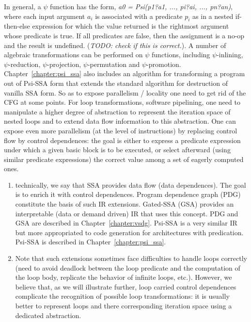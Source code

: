 In general, a $\psi$ function has the form, {\em a0 = Psi(p1?a1, ..., pi?ai, ..., pn?an)}, where each input argument $a_i$ is associated with a predicate $p_i$ as in a nested if-then-else expression for which the value returned is the rightmost argument whose predicate is true.  If all predicates are false, then the assignment is a no-op and the result is undefined.  ({\em TODO: check if this is correct.}).   A number of algebraic transformations can be performed on $\psi$ functions, including 
$\psi$-inlining, $\psi$-reduction, $\psi$-projection, $\psi$-permutation and $\psi$-promotion.  Chapter~\ref{chapter:psi_ssa} also includes an algorithm for transforming a program out of Psi-SSA form that extends the standard algorithm for destruction of vanilla SSA form. So as to expose parallelism / locality one need to get rid of the CFG at some points. For loop transformations, software pipelining, one need  to manipulate a higher degree of abstraction to represent the iteration space of nested loops and to extend data flow information to this abstraction. One can expose even more parallelism (at the level of instructions) by replacing control flow by control dependences: the goal is either to express a predicate expression under which a given basic block is to be executed, or select afterward (using similar predicate expressions) the correct value among a set of eagerly computed ones.
\begin{enumerate}
\item technically, we say that SSA provides data flow (data dependences). The goal is to enrich it with control dependences. Program dependence graph (PDG) constitute the basis of such IR extensions. Gated-SSA (GSA) provides an interpretable (data or demand driven) IR that uses this concept. PDG and GSA are described in Chapter~\ref{chapter:vsdg}. Psi-SSA is a very similar IR but more appropriated to code generation for architectures with predication. Psi-SSA is described in Chapter~\ref{chapter:psi_ssa}.
\item Note that such extensions sometimes face difficulties to handle loops correctly (need to avoid deadlock between the loop predicate and the computation of the loop body, replicate the behavior of infinite loops, etc.). However, we believe that, as we will illustrate further, loop carried control dependences complicate the recognition of possible loop transformations: it is usually better to represent loops and there corresponding iteration space using a dedicated abstraction. 
\end{enumerate}


